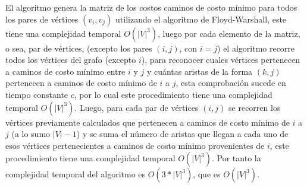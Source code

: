 \documentclass[article]{llncs}
\begin{document}
El algoritmo genera la matriz de los costos caminos de costo mínimo para todos los pares de vértices $(v_i,v_j)$ utilizando el algoritmo
de Floyd-Warshall, este tiene una complejidad temporal $O(|V|^3)$, luego por cada elemento de la matriz, o sea, par de vértices, (excepto los pares $(i,j)$, con $i=j$)
el algoritmo recorre todos los vértices del grafo (excepto $i$), para reconocer cuales vértices pertenecen a caminos de costo mínimo entre $i$ y $j$ y cuántas aristas de la forma $(k,j)$ pertenecen
 a caminos de costo mínimo de $i$ a $j$, esta comprobación sucede en tiempo constante $c$, por lo cual este procedimiento tiene una complejidad temporal $O(|V|^3)$. Luego, para cada par de vértices $(i,j)$ se recorren los vértices previamente calculados
 que pertenecen a caminos de costo mínimo de $i$ a $j$ (a lo sumo $|V|-1$) y se suma el número de aristas que llegan a cada uno de esos vértices pertenecientes a caminos de costo mínimo provenientes de $i$, este procedimiento tiene una complejidad temporal $O(|V|^3)$.
 Por tanto la complejidad temporal del algoritmo es $O(3*|V|^3)$, que es $O(|V|^3)$.
\end{document}
